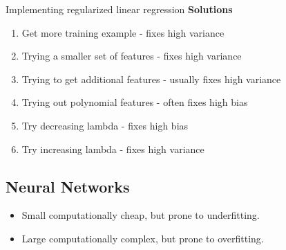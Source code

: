 



Implementing regularized linear regression
\textbf{Solutions}

\begin{enumerate}
\item Get more training example - fixes high variance
\item Trying a smaller set of features - fixes high variance
\item Trying to get additional features - usually fixes high variance
\item Trying out polynomial features - often fixes high bias
\item Try decreasing lambda - fixes high bias
\item Try increasing lambda - fixes high variance
\end{enumerate}

\subsection*{Neural Networks}
\begin{itemize}
\item Small computationally cheap, but prone to underfitting.
\item Large computationally complex, but prone to overfitting.
\end{itemize}
	

